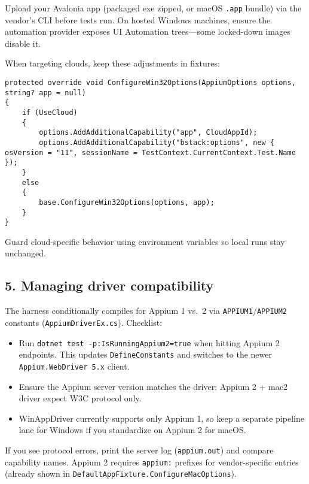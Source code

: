 Upload your Avalonia app (packaged exe zipped, or macOS
\passthrough{\lstinline!.app!} bundle) via the vendor's CLI before tests
run. On hosted Windows machines, ensure the automation provider exposes
UI Automation trees---some locked-down images disable it.

When targeting clouds, keep these adjustments in fixtures:

\begin{lstlisting}
protected override void ConfigureWin32Options(AppiumOptions options, string? app = null)
{
    if (UseCloud)
    {
        options.AddAdditionalCapability("app", CloudAppId);
        options.AddAdditionalCapability("bstack:options", new { osVersion = "11", sessionName = TestContext.CurrentContext.Test.Name });
    }
    else
    {
        base.ConfigureWin32Options(options, app);
    }
}
\end{lstlisting}

Guard cloud-specific behavior using environment variables so local runs
stay unchanged.

\subsection{5. Managing driver
compatibility}\label{managing-driver-compatibility}

The harness conditionally compiles for Appium 1 vs.~2 via
\passthrough{\lstinline!APPIUM1!}/\passthrough{\lstinline!APPIUM2!}
constants (\passthrough{\lstinline!AppiumDriverEx.cs!}). Checklist:

\begin{itemize}
\tightlist
\item
  Run \passthrough{\lstinline!dotnet test -p:IsRunningAppium2=true!}
  when hitting Appium 2 endpoints. This updates
  \passthrough{\lstinline!DefineConstants!} and switches to the newer
  \passthrough{\lstinline!Appium.WebDriver 5.x!} client.
\item
  Ensure the Appium server version matches the driver: Appium 2 + mac2
  driver expect W3C protocol only.
\item
  WinAppDriver currently supports only Appium 1, so keep a separate
  pipeline lane for Windows if you standardize on Appium 2 for macOS.
\end{itemize}

If you see protocol errors, print the server log
(\passthrough{\lstinline!appium.out!}) and compare capability names.
Appium 2 requires \passthrough{\lstinline!appium:!} prefixes for
vendor-specific entries (already shown in
\passthrough{\lstinline!DefaultAppFixture.ConfigureMacOptions!}).

